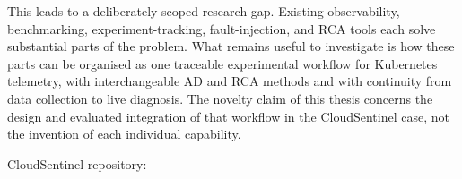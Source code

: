 This leads to a deliberately scoped research gap. Existing observability, benchmarking, experiment-tracking, fault-injection, and RCA tools each solve substantial parts of the problem. What remains useful to investigate is how these parts can be organised as one traceable experimental workflow for Kubernetes telemetry, with interchangeable AD and RCA methods and with continuity from data collection to live diagnosis. The novelty claim of this thesis concerns the design and evaluated integration of that workflow in the CloudSentinel case, not the invention of each individual capability.

CloudSentinel repository: 
